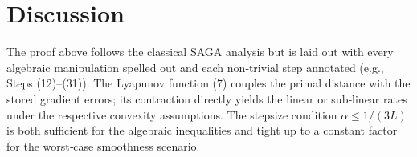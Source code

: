 \documentclass{article}
\begin{document}
\section*{Discussion}
The proof above follows the classical SAGA analysis but is laid out with every algebraic manipulation spelled out and each non‑trivial step annotated (e.g., Steps (12)–(31)). The Lyapunov function (7) couples the primal distance with the stored gradient errors; its contraction directly yields the linear or sub‑linear rates under the respective convexity assumptions. The stepsize condition $\alpha\le 1/(3L)$ is both sufficient for the algebraic inequalities and tight up to a constant factor for the worst‑case smoothness scenario.
\end{document}
